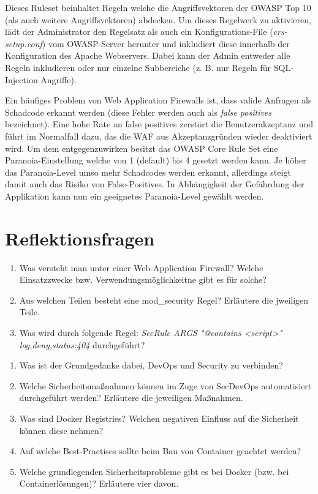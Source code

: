 Dieses Ruleset beinhaltet Regeln welche die Angriffsvektoren der OWASP Top 10 (als auch weitere Angriffsvektoren) abdecken. Um dieses Regelwerk zu aktivieren, lädt der Administrator den Regelsatz als auch ein Konfigurations-File (\textit{crs-setup.conf}) vom OWASP-Server herunter und inkludiert diese innerhalb der Konfiguration des Apache Webservers. Dabei kann der Admin entweder alle Regeln inkludieren oder nur einzelne Subbereiche (z. B. nur Regeln für SQL-Injection Angriffe).

Ein häufiges Problem von Web Application Firewalls ist, dass valide Anfragen als Schadcode erkannt werden (diese Fehler werden auch als \textit{false positives} bezeichnet). Eine hohe Rate an false positives zerstört die Benutzerakzeptanz und führt im Normalfall dazu, das die WAF aus Akzeptanzgründen wieder deaktiviert wird. Um dem entgegenzuwirken besitzt das OWASP Core Rule Set eine Paranoia-Einstellung welche von 1 (default) bis 4 gesetzt werden kann. Je höher das Paranoia-Level umso mehr Schadcodes werden erkannt, allerdings steigt damit auch das Risiko von False-Positives. In Abhängigkeit der Gefährdung der Applikation kann nun ein geeignetes Paranoia-Level gewählt werden.

\section{Reflektionsfragen}

\begin{enumerate}
	\item Was versteht man unter einer Web-Application Firewall? Welche Einsatzzwecke bzw. Verwendungsmöglichkeitne gibt es für solche?
	\item Aus welchen Teilen besteht eine mod\_security Regel? Erläutere die jweiligen Teile.
	\item Was wird durch folgende Regel: \textit{SecRule ARGS "@contains <script>" log,deny,status:404} durchgeführt?
\end{enumerate}

\begin{enumerate}
	\item Was ist der Grundgedanke dabei, DevOps und Security zu verbinden?
	\item Welche Sicherheitsmaßnahmen können im Zuge von SecDevOps automatisiert durchgeführt werden? Erläutere die jeweiligen Maßnahmen.
	\item Was sind Docker Registries? Welchen negativen Einfluss auf die Sicherheit können diese nehmen?
	\item Auf welche Best-Practises sollte beim Bau von Container geachtet werden?
	\item Welche grundlegenden Sicherheitsprobleme gibt es bei Docker (bzw. bei Containerlösungen)? Erläutere vier davon.
\end{enumerate}
